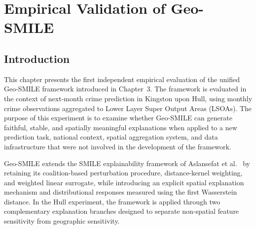 \chapter{Empirical Validation of Geo-SMILE}
\label{chap:Empirical Validation}
\ifpdf
    \graphicspath{{Chapter4/Figs/Raster/}{Chapter4/Figs/PDF/}{Chapter4/Figs/}}
\else
    \graphicspath{{Chapter4/Figs/Vector/}{Chapter4/Figs/}}
\fi

\section{Introduction}
\label{SEC:hull_intro}

This chapter presents the first independent empirical evaluation of the unified Geo-SMILE framework introduced in Chapter~3. The framework is evaluated in the context of next-month crime prediction in Kingston upon Hull, using monthly crime observations aggregated to Lower Layer Super Output Areas (LSOAs). The purpose of this experiment is to examine whether Geo-SMILE can generate faithful, stable, and spatially meaningful explanations when applied to a new prediction task, national context, spatial aggregation system, and data infrastructure that were not involved in the development of the framework.

Geo-SMILE extends the SMILE explainability framework of Aslansefat et al.\ \cite{aslansefat2021smile} by retaining its coalition-based perturbation procedure, distance-kernel weighting, and weighted linear surrogate, while introducing an explicit spatial explanation mechanism and distributional responses measured using the first Wasserstein distance. In the Hull experiment, the framework is applied through two complementary explanation branches designed to separate non-spatial feature sensitivity from geographic sensitivity.

